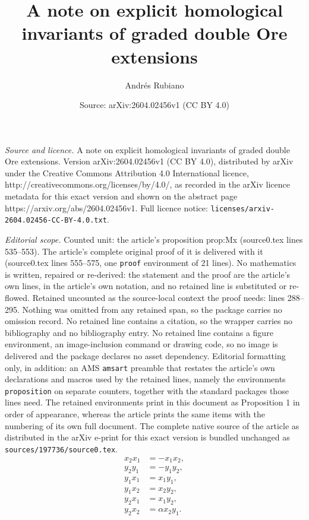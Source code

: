 \documentclass[10pt,a4paper]{amsart}
\title{A note on explicit homological invariants of graded double Ore extensions}
\author{Andr\'es Rubiano}
\date{Source: arXiv:2604.02456v1 (CC BY 4.0)}
\begin{document}
\maketitle

\noindent\emph{Source and licence.} A note on explicit homological invariants of graded double Ore extensions. Version arXiv:2604.02456v1 (CC BY 4.0), distributed by arXiv under the Creative Commons Attribution 4.0 International licence, http://creativecommons.org/licenses/by/4.0/, as recorded in the arXiv licence metadata for this exact version and shown on the abstract page https://arxiv.org/abs/2604.02456v1. Full licence notice: \texttt{licenses/arxiv-2604.02456-CC-BY-4.0.txt}.\par\smallskip

\noindent\textit{Editorial scope.} Counted unit: the article's proposition prop:Mx (source0.tex lines 535--553). The article's complete original proof of it is delivered with it (source0.tex lines 555--575, one \texttt{proof} environment of 21 lines). No mathematics is written, repaired or re-derived: the statement and the proof are the article's own lines, in the article's own notation, and no retained line is substituted or re-flowed.  Retained uncounted as the source-local context the proof needs: lines 288--295.  Nothing was omitted from any retained span, so the package carries no omission record.  No retained line contains a citation, so the wrapper carries no bibliography and no bibliography entry.  No retained line contains a figure environment, an image-inclusion command or drawing code, so no image is delivered and the package declares no asset dependency.  Editorial formatting only, in addition: an AMS \texttt{amsart} preamble that restates the article's own declarations and macros used by the retained lines, namely the environments \texttt{proposition} on separate counters, together with the standard packages those lines need.  The retained environments print in this document as Proposition 1 in order of appearance, whereas the article prints the same items with the numbering of its own full document.  The complete native source of the article as distributed in the arXiv e-print for this exact version is bundled unchanged as \texttt{sources/197736/source0.tex}.
\begin{align}
x_2x_1 &= -x_1x_2,\label{eq:K1}\\
y_2y_1 &= -y_1y_2,\label{eq:K2}\\
y_1x_1 &= x_1y_1,\label{eq:K3}\\
y_1x_2 &= x_2y_2,\label{eq:K4}\\
y_2x_1 &= x_1y_2,\label{eq:K5}\\
y_2x_2 &= \alpha x_2y_1.\label{eq:K6}
\end{align}
\end{document}
